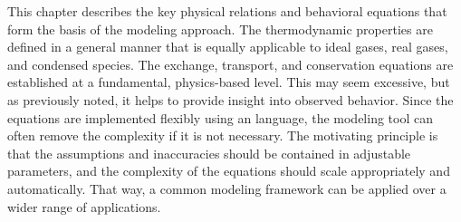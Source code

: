 

\glsresetall


\makeatletter
\newcommand{\labelpage}[1]{\leaders\hbox{$\m@th
        \mkern \@dotsep mu\hbox{.}\mkern \@dotsep
        mu$}\hfill
     \nobreak\hb@xt@\@pnumwidth{\hfil\normalfont \normalcolor \pageref{#1}}}
\makeatother

\renewenvironment{contextbox}
{\vspace{-0.7em}
   \begin{framed}
   \setlength\parindent{0pt}}
{  %
 \end{framed}}





This chapter describes the key physical relations and behavioral equations that form the basis of the modeling approach.  The thermodynamic properties are defined in a general manner that is equally applicable to ideal gases, real gases, and condensed species.  The exchange, transport, and conservation equations are established at a fundamental, physics-based level.  This may seem excessive, but as previously noted, it helps to provide insight into observed behavior.  Since the equations are implemented flexibly using an  language, the modeling tool can often remove the complexity if it is not necessary.  The motivating principle is that the assumptions and inaccuracies should be contained in adjustable parameters, and the complexity of the equations should scale appropriately and automatically.  That way, a common modeling framework can be applied over a wider range of applications.

